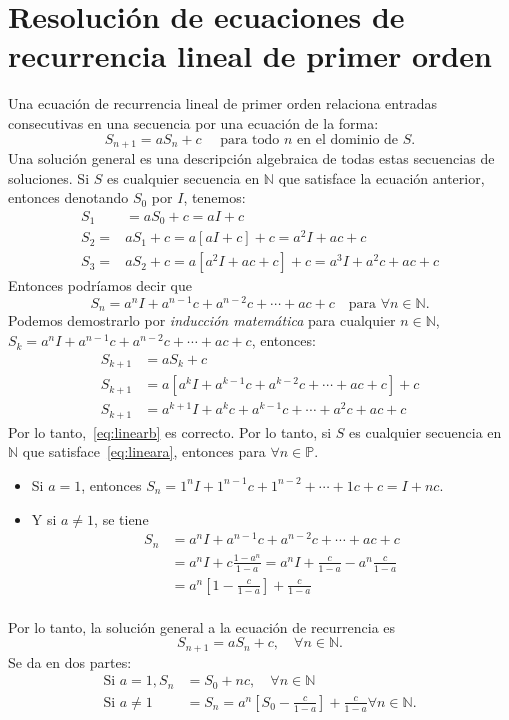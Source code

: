 \section{Resolución de ecuaciones de recurrencia lineal de primer orden}

Una ecuación de recurrencia lineal de primer orden relaciona entradas consecutivas en una secuencia por una ecuación de la forma:
\begin{equation}\label{eq:lineara}
S_{n+1}=a S_{n}+c\quad\text{ para todo }n\text{ en el dominio de } S.
\end{equation}
Una solución general es una descripción algebraica de todas estas secuencias de soluciones. Si $S$ es cualquier secuencia en $\mathds{N}$ que satisface la ecuación anterior, entonces denotando $S_{0}$ por $I$, tenemos:
\begin{align*}
S_1&=aS_0+c=aI+c \\
S_2=&aS_1+c=a[aI+c]+c=a^2I+ac+c \\
S_3=&aS_2+c=a[a^2I+ac+c]+c=a^3I+a^2c+ac+c
\end{align*}
Entonces podríamos decir que
\begin{equation}\label{eq:linearb}
S_n = a^nI+a^{n-1}c+a^{n-2}c +\cdots+ac+c\quad\text{para }\forall n\in\mathds{N}.
\end{equation}
Podemos demostrarlo por \emph{inducción matemática} para cualquier $n\in\mathds{N}$, $S_k=a^nI+a^{n-1}c+a^{n-2}c+\cdots+ac+c$, entonces:
\begin{align*}
S_{k+1}&=aS_{k} + c  \\
S_{k+1}&=a\left[a^kI+a^{k-1}c+a^{k-2}c+\cdots+ac+c\right] + c\\
S_{k+1}&=a^{k+1}I+a^k c+a^{k-1}c+\cdots+a^2c+ac+c
\end{align*}
Por lo tanto,~\eqref{eq:linearb} es correcto. Por lo tanto, si $S$ es cualquier secuencia en $\mathds{N}$ que satisface~\eqref{eq:lineara}, entonces para $\forall n\in \mathds{P}$.
\begin{itemize}
	\item Si $a=1$, entonces $S_n=1^nI+1^{n-1}c+1^{n-2}+\cdots+1c+c=I+nc$.
	\item Y si $a\neq1$, se tiene
	\begin{align*}
	S_n&=a^{n}I+a^{n-1}c+a^{n-2}c+\cdots+ac+c\\
	&=a^{n}I+c\frac{1-a^n}{1-a}=a^nI+\frac{c}{1-a}-a^n\frac{c}{1-a}\\
	&=a^{n}\left[1-\frac{c}{1-a}\right]+\frac{c}{1-a}\\
	\end{align*}
\end{itemize}
Por lo tanto, la solución general a la ecuación de recurrencia es \[ S_{n+1} = aS_n+c,\quad\forall n\in\mathds{N}. \] Se da en dos partes:
\begin{align*}
\text{Si }a=1, S_n&= S_0+ nc,\quad\forall n\in\mathds{N}\\
\text{Si }a\neq1&=S_n= a^{n}\left[S_0-\frac{c}{1-a}\right]+\frac{c}{1-a}\forall n\in\mathds{N}.
\end{align*}

